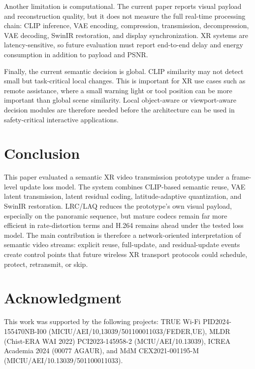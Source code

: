 \documentclass[conference]{IEEEtran}
\begin{document}
Another limitation is computational. The current paper reports visual payload and reconstruction quality, but it does not measure the full real-time processing chain: CLIP inference, VAE encoding, compression, transmission, decompression, VAE decoding, SwinIR restoration, and display synchronization. XR systems are latency-sensitive, so future evaluation must report end-to-end delay and energy consumption in addition to payload and PSNR.

Finally, the current semantic decision is global. CLIP similarity may not detect small but task-critical local changes. This is important for XR use cases such as remote assistance, where a small warning light or tool position can be more important than global scene similarity. Local object-aware or viewport-aware decision modules are therefore needed before the architecture can be used in safety-critical interactive applications.


\section{Conclusion}

This paper evaluated a semantic XR video transmission prototype under a frame-level update loss model. The system combines CLIP-based semantic reuse, VAE latent transmission, latent residual coding, latitude-adaptive quantization, and SwinIR restoration. LRC/LAQ reduces the prototype's own visual payload, especially on the panoramic sequence, but mature codecs remain far more efficient in rate-distortion terms and H.264 remains ahead under the tested loss model. The main contribution is therefore a network-oriented interpretation of semantic video streams: explicit reuse, full-update, and residual-update events create control points that future wireless XR transport protocols could schedule, protect, retransmit, or skip.

\section*{Acknowledgment}

This work was supported by the following projects: TRUE Wi-Fi PID2024-155470NB-I00 (MICIU/AEI/10,13039/501100011033/FEDER,UE), MLDR (Chist-ERA WAI 2022) PCI2023-145958-2 (MCIU/AEI/10.13039), ICREA Academia 2024 (00077 AGAUR), and MdM CEX2021-001195-M (MICIU/AEI/10.13039/501100011033).



\end{document}

